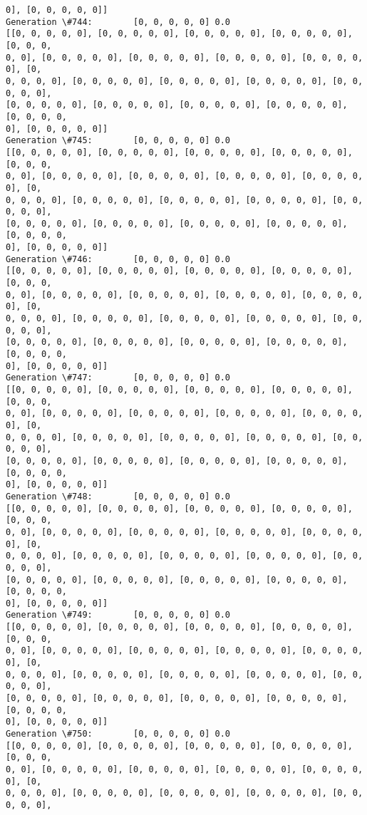 \documentclass[11pt]{article}
\begin{document}
\begin{Verbatim}[commandchars=\\\{\}]
0], [0, 0, 0, 0, 0]]
Generation \#744:        [0, 0, 0, 0, 0] 0.0
[[0, 0, 0, 0, 0], [0, 0, 0, 0, 0], [0, 0, 0, 0, 0], [0, 0, 0, 0, 0], [0, 0, 0,
0, 0], [0, 0, 0, 0, 0], [0, 0, 0, 0, 0], [0, 0, 0, 0, 0], [0, 0, 0, 0, 0], [0,
0, 0, 0, 0], [0, 0, 0, 0, 0], [0, 0, 0, 0, 0], [0, 0, 0, 0, 0], [0, 0, 0, 0, 0],
[0, 0, 0, 0, 0], [0, 0, 0, 0, 0], [0, 0, 0, 0, 0], [0, 0, 0, 0, 0], [0, 0, 0, 0,
0], [0, 0, 0, 0, 0]]
Generation \#745:        [0, 0, 0, 0, 0] 0.0
[[0, 0, 0, 0, 0], [0, 0, 0, 0, 0], [0, 0, 0, 0, 0], [0, 0, 0, 0, 0], [0, 0, 0,
0, 0], [0, 0, 0, 0, 0], [0, 0, 0, 0, 0], [0, 0, 0, 0, 0], [0, 0, 0, 0, 0], [0,
0, 0, 0, 0], [0, 0, 0, 0, 0], [0, 0, 0, 0, 0], [0, 0, 0, 0, 0], [0, 0, 0, 0, 0],
[0, 0, 0, 0, 0], [0, 0, 0, 0, 0], [0, 0, 0, 0, 0], [0, 0, 0, 0, 0], [0, 0, 0, 0,
0], [0, 0, 0, 0, 0]]
Generation \#746:        [0, 0, 0, 0, 0] 0.0
[[0, 0, 0, 0, 0], [0, 0, 0, 0, 0], [0, 0, 0, 0, 0], [0, 0, 0, 0, 0], [0, 0, 0,
0, 0], [0, 0, 0, 0, 0], [0, 0, 0, 0, 0], [0, 0, 0, 0, 0], [0, 0, 0, 0, 0], [0,
0, 0, 0, 0], [0, 0, 0, 0, 0], [0, 0, 0, 0, 0], [0, 0, 0, 0, 0], [0, 0, 0, 0, 0],
[0, 0, 0, 0, 0], [0, 0, 0, 0, 0], [0, 0, 0, 0, 0], [0, 0, 0, 0, 0], [0, 0, 0, 0,
0], [0, 0, 0, 0, 0]]
Generation \#747:        [0, 0, 0, 0, 0] 0.0
[[0, 0, 0, 0, 0], [0, 0, 0, 0, 0], [0, 0, 0, 0, 0], [0, 0, 0, 0, 0], [0, 0, 0,
0, 0], [0, 0, 0, 0, 0], [0, 0, 0, 0, 0], [0, 0, 0, 0, 0], [0, 0, 0, 0, 0], [0,
0, 0, 0, 0], [0, 0, 0, 0, 0], [0, 0, 0, 0, 0], [0, 0, 0, 0, 0], [0, 0, 0, 0, 0],
[0, 0, 0, 0, 0], [0, 0, 0, 0, 0], [0, 0, 0, 0, 0], [0, 0, 0, 0, 0], [0, 0, 0, 0,
0], [0, 0, 0, 0, 0]]
Generation \#748:        [0, 0, 0, 0, 0] 0.0
[[0, 0, 0, 0, 0], [0, 0, 0, 0, 0], [0, 0, 0, 0, 0], [0, 0, 0, 0, 0], [0, 0, 0,
0, 0], [0, 0, 0, 0, 0], [0, 0, 0, 0, 0], [0, 0, 0, 0, 0], [0, 0, 0, 0, 0], [0,
0, 0, 0, 0], [0, 0, 0, 0, 0], [0, 0, 0, 0, 0], [0, 0, 0, 0, 0], [0, 0, 0, 0, 0],
[0, 0, 0, 0, 0], [0, 0, 0, 0, 0], [0, 0, 0, 0, 0], [0, 0, 0, 0, 0], [0, 0, 0, 0,
0], [0, 0, 0, 0, 0]]
Generation \#749:        [0, 0, 0, 0, 0] 0.0
[[0, 0, 0, 0, 0], [0, 0, 0, 0, 0], [0, 0, 0, 0, 0], [0, 0, 0, 0, 0], [0, 0, 0,
0, 0], [0, 0, 0, 0, 0], [0, 0, 0, 0, 0], [0, 0, 0, 0, 0], [0, 0, 0, 0, 0], [0,
0, 0, 0, 0], [0, 0, 0, 0, 0], [0, 0, 0, 0, 0], [0, 0, 0, 0, 0], [0, 0, 0, 0, 0],
[0, 0, 0, 0, 0], [0, 0, 0, 0, 0], [0, 0, 0, 0, 0], [0, 0, 0, 0, 0], [0, 0, 0, 0,
0], [0, 0, 0, 0, 0]]
Generation \#750:        [0, 0, 0, 0, 0] 0.0
[[0, 0, 0, 0, 0], [0, 0, 0, 0, 0], [0, 0, 0, 0, 0], [0, 0, 0, 0, 0], [0, 0, 0,
0, 0], [0, 0, 0, 0, 0], [0, 0, 0, 0, 0], [0, 0, 0, 0, 0], [0, 0, 0, 0, 0], [0,
0, 0, 0, 0], [0, 0, 0, 0, 0], [0, 0, 0, 0, 0], [0, 0, 0, 0, 0], [0, 0, 0, 0, 0],

\end{Verbatim}
\end{document}
